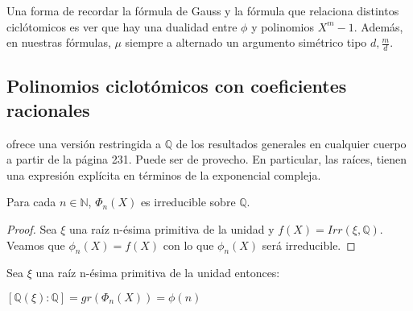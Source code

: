 Una forma de recordar la fórmula de Gauss y la fórmula que relaciona distintos ciclótomicos es ver que hay una dualidad entre $\phi$ y polinomios $X^m - 1$. Además, en nuestras fórmulas, $\mu$ siempre a alternado un argumento simétrico tipo $d, \frac{m}{d}$. 


\subsection{Polinomios ciclotómicos con coeficientes racionales}

\cite{cox} ofrece una versión restringida a $\mathbb{Q}$ de los resultados generales en cualquier cuerpo a partir de la página 231. Puede ser de provecho. En particular, las raíces, tienen una expresión explícita en términos de la exponencial compleja. 

\begin{proposition}
Para cada $n \in \mathbb{N}$, $\Phi_n(X)$ es irreducible sobre $\mathbb{Q}$.
\end{proposition}
\begin{proof}
Sea $\xi$ una raíz n-ésima primitiva de la unidad y $f(X) = Irr(\xi,\mathbb{Q})$. Veamos que $\phi_n(X) = f(X)$ con lo que $\phi_n(X)$ será irreducible. 
\end{proof}

\begin{corollary}
Sea $\xi$ una raíz n-ésima primitiva de la unidad entonces:

$[\mathbb{Q}(\xi):\mathbb{Q}] = gr(\Phi_n(X)) = \phi(n)$
\end{corollary}


